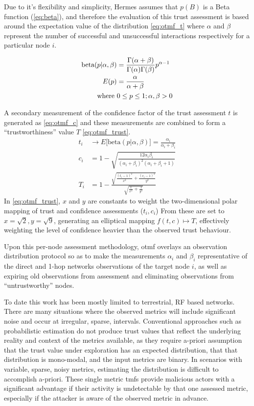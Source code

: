 Due to it's flexibility and simplicity, Hermes assumes that $p(B)$ is a Beta function (\eqref{eq:beta}), and therefore the evaluation of this trust assessment is based around the expectation value of the distribution \eqref{eq:otmf_t}  where $\alpha$ and $\beta$ represent the number of successful and unsuccessful interactions respectively for a particular node $i$.

\begin{align}
  \label{eq:beta}
  \text{beta}(p|\alpha,\beta) &= \frac{\Gamma(\alpha + \beta)}{\Gamma(\alpha)\Gamma(\beta)}p^{\alpha-1}\\
  \label{eq:beta_e}
  E(p) &= \frac{\alpha}{\alpha + \beta}\\
  \text{where } &0 \leq p \leq 1; \alpha,\beta > 0 \notag
\end{align}
%

A secondary measurement of the confidence factor of the trust assessment $t$ is generated as \eqref{eq:otmf_c} and these measurements are combined to form a ``trustworthiness'' value $T$ \eqref{eq:otmf_trust}.
%
\begin{align}
  t_i &\to E\lbrack\text{beta}(p|\alpha,\beta)\rbrack = \frac{\alpha_i}{\alpha_i+\beta_i} \label{eq:otmf_t}\\[5pt]
  c_i &= 1 - \sqrt{\frac{12\alpha_i\beta_i}{(\alpha_i+\beta_i)^2(\alpha_i+\beta_i+1)}} \label{eq:otmf_c}\\[5pt]
  T_i &= 1 - \frac{\sqrt{\frac{(t_i-1)^2}{x^2} + \frac{(c_i-1)^2}{y^2}}}{\sqrt{\frac{1}{x^2}+\frac{1}{y^2}}} \label{eq:otmf_trust}
\end{align}
%
In \eqref{eq:otmf_trust}, $x$ and $y$ are constants to weight the two-dimensional polar mapping of trust and confidence assessments ($t_i,c_i$)
From \citet{Zouridaki2005} these are set to $x=\sqrt{2},y=\sqrt{9}$, generating an elliptical mapping $f(t,c) \mapsto T$, effectively weighting the level of confidence heavier than the observed trust behaviour.

Upon this per-node assessment methodology, \gls{otmf} overlays an observation distribution protocol so as to make the measurements $\alpha_i$ and $\beta_i$ representative of the direct and 1-hop networks observations of the target node $i$, as well as expiring old observations from assessment and eliminating observations from ``untrustworthy'' nodes.



To date this work has been mostly limited to terrestrial, RF based networks.
There are many situations where the observed metrics will include significant noise and occur at irregular, sparse, intervals.
Conventional approaches such as probabilistic estimation do not produce trust values that reflect the underlying reality and context of the metrics available, as they require a-priori assumption that the trust value under exploration has an expected distribution, that that distribution is mono-modal, and the input metrics are binary.
In scenarios with variable, sparse, noisy metrics, estimating the distribution is difficult to accomplish a-priori.
These single metric \glspl{tmf} provide malicious actors with a significant advantage if their activity is undetectable by that one assessed metric, especially if the attacker is aware of the observed metric in advance.

